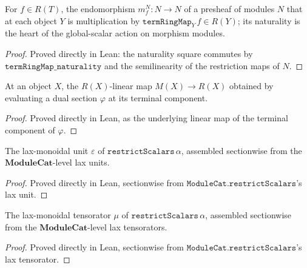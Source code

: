 \begin{definition}\leanok
  \label{def:global_smul}
  For \(f \in R(T)\), the endomorphism \(m_f^{N} : N \to N\) of a presheaf of modules
  \(N\) that at each object \(Y\) is multiplication by \(\mathtt{termRingMap}_Y\,f \in
  R(Y)\); its naturality is the heart of the global-scalar action on morphism modules.
\end{definition}
\begin{proof}
  \leanok
  Proved directly in Lean: the naturality square commutes by
  \(\mathtt{termRingMap\_naturality}\) and the semilinearity of the restriction maps of
  \(N\).
\end{proof}

\begin{definition}\leanok
  \label{def:eval_lin}
  At an object \(X\), the \(R(X)\)-linear map \(M(X) \to R(X)\) obtained by evaluating
  a dual section \(\varphi\) at its terminal component.
\end{definition}
\begin{proof}
  \leanok
  Proved directly in Lean, as the underlying linear map of the terminal component of
  \(\varphi\).
\end{proof}

\begin{definition}\leanok
  \label{def:restrict_scalars_lax_epsilon}
  The lax-monoidal unit \(\varepsilon\) of \(\mathtt{restrictScalars}\,\alpha\),
  assembled sectionwise from the \(\mathbf{ModuleCat}\)-level lax units.
\end{definition}
\begin{proof}
  \leanok
  Proved directly in Lean, sectionwise from
  \(\mathtt{ModuleCat.restrictScalars}\)'s lax unit.
\end{proof}

\begin{definition}\leanok
  \label{def:restrict_scalars_lax_mu}
  The lax-monoidal tensorator \(\mu\) of \(\mathtt{restrictScalars}\,\alpha\),
  assembled sectionwise from the \(\mathbf{ModuleCat}\)-level lax tensorators.
\end{definition}
\begin{proof}
  \leanok
  Proved directly in Lean, sectionwise from
  \(\mathtt{ModuleCat.restrictScalars}\)'s lax tensorator.
\end{proof}

